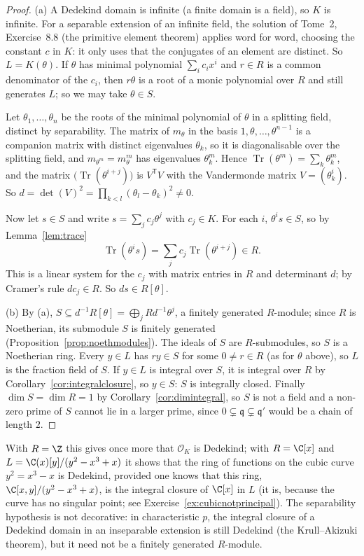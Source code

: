 \begin{proof}
(a) A Dedekind domain is infinite (a finite domain is a field), so $K$ is infinite. For a separable extension of an infinite field, the solution of Tome~2, Exercise~8.8 (the primitive element theorem) applies word for word,
choosing the constant $c$ in $K$: it only uses that the conjugates of an element are distinct. So $L=K(\theta)$. If $\theta$ has minimal polynomial $\sum_ic_ix^i$ and $r\in R$ is a common denominator of the $c_i$, then
$r\theta$ is a root of a monic polynomial over $R$ and still generates $L$; so we may take $\theta\in S$.

Let $\theta_1,\dots,\theta_n$ be the roots of the minimal polynomial of $\theta$ in a splitting field, distinct by separability. The matrix of $m_\theta$ in the basis $1,\theta,\dots,\theta^{n-1}$ is a companion matrix with distinct
eigenvalues $\theta_k$, so it is diagonalisable over the splitting field, and $m_{\theta^m}=m_\theta^m$ has eigenvalues $\theta_k^m$. Hence $\operatorname{Tr}(\theta^m)=\sum_k\theta_k^m$, and the matrix
$\bigl(\operatorname{Tr}(\theta^{i+j})\bigr)$ is $V^{\mathsf T}V$ with the Vandermonde matrix $V=(\theta_k^i)$. So $d=\det(V)^2=\prod_{k<l}(\theta_l-\theta_k)^2\ne0$.

Now let $s\in S$ and write $s=\sum_jc_j\theta^j$ with $c_j\in K$. For each $i$, $\theta^is\in S$, so by Lemma~\ref{lem:trace}
\[
\operatorname{Tr}(\theta^is)=\sum_jc_j\operatorname{Tr}(\theta^{i+j})\in R .
\]
This is a linear system for the $c_j$ with matrix entries in $R$ and determinant $d$; by Cramer's rule $dc_j\in R$. So $ds\in R[\theta]$.

(b) By (a), $S\subseteq d^{-1}R[\theta]=\bigoplus_jRd^{-1}\theta^j$, a finitely generated $R$-module; since $R$ is Noetherian, its submodule $S$ is finitely generated (Proposition~\ref{prop:noethmodules}). The ideals of $S$ are
$R$-submodules, so $S$ is a Noetherian ring. Every $y\in L$ has $ry\in S$ for some $0\ne r\in R$ (as for $\theta$ above), so $L$ is the fraction field of $S$. If $y\in L$ is integral over $S$, it is integral over $R$ by
Corollary~\ref{cor:integralclosure}, so $y\in S$: $S$ is integrally closed. Finally $\dim S=\dim R=1$ by Corollary~\ref{cor:dimintegral}, so $S$ is not a field and a non-zero prime of $S$ cannot lie in a larger prime, since
$0\subsetneq\mathfrak q\subsetneq\mathfrak q'$ would be a chain of length $2$.
\end{proof}

With $R=\Z$ this gives once more that $\mathcal O_K$ is Dedekind; with $R=\C[x]$ and $L=\C(x)[y]/(y^2-x^3+x)$ it shows that the ring of functions on the cubic curve $y^2=x^3-x$ is Dedekind, provided one knows that this
ring, $\C[x,y]/(y^2-x^3+x)$, is the integral closure of $\C[x]$ in $L$ (it is, because the curve has no singular point; see Exercise~\ref{ex:cubicnotprincipal}). The separability hypothesis is not decorative: in characteristic $p$, the
integral closure of a Dedekind domain in an inseparable extension is still Dedekind (the Krull--Akizuki theorem), but it need not be a finitely generated $R$-module.

